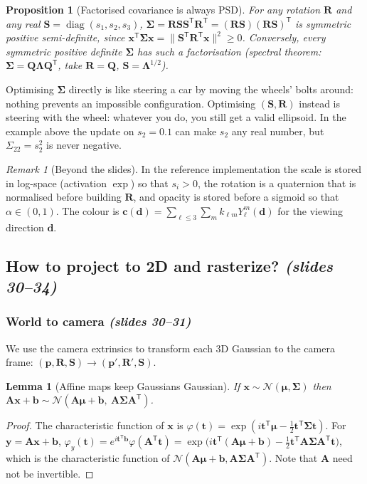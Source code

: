 \documentclass[11pt,a4paper]{article}
\newcommand{\sr}[1]{\texorpdfstring{\emph{(#1)}}{(#1)}}
\newcommand{\T}{^{\mathsf T}}
\newcommand{\N}{\mathcal{N}}
\DeclareMathOperator{\diag}{diag}
\theoremstyle{definition}
\theoremstyle{plain}
\newtheorem{lemma}[definition]{Lemma}
\newtheorem{proposition}[definition]{Proposition}
\theoremstyle{remark}
\newtheorem{remark}[definition]{Remark}
\begin{document}
\begin{proposition}[Factorised covariance is always PSD]
For any rotation $\bm R$ and any real $\bm S=\diag(s_1,s_2,s_3)$, $\bm\Sigma=\bm R\bm S\bm S\T\bm R\T=(\bm R\bm S)(\bm R\bm S)\T$ is symmetric positive semi-definite, since
$\bm x\T\bm\Sigma\bm x=\|\bm S\T\bm R\T\bm x\|^2\ge0$. Conversely, every symmetric positive definite $\bm\Sigma$ has such a factorisation (spectral theorem: $\bm\Sigma=\bm Q\bm\Lambda\bm Q\T$, take $\bm R=\bm Q$, $\bm S=\bm\Lambda^{1/2}$).
\end{proposition}

\begin{intuition}
Optimising $\bm\Sigma$ directly is like steering a car by moving the wheels' bolts around: nothing prevents an impossible configuration. Optimising $(\bm S,\bm R)$ instead is steering with the wheel: whatever you do, you still get a valid ellipsoid. In the example above the update on $s_2=0.1$ can make $s_2$ any real number, but $\Sigma_{22}=s_2^2$ is never negative.
\end{intuition}

\begin{remark}[Beyond the slides]
In the reference implementation the scale is stored in log-space (activation $\exp$) so that $s_i>0$, the rotation is a quaternion that is normalised before building $\bm R$, and opacity is stored before a sigmoid so that $\alpha\in(0,1)$. The colour is $\bm c(\bm d)=\sum_{\ell\le3}\sum_{m}k_{\ell m}Y_\ell^m(\bm d)$ for the viewing direction $\bm d$.
\end{remark}

\subsection{How to project to 2D and rasterize? \sr{slides 30--34}}
\subsubsection{World to camera \sr{slides 30--31}}
We use the camera extrinsics to transform each 3D Gaussian to the camera frame: $(\bm p,\bm R,\bm S)\to(\bm p',\bm R',\bm S)$.

\begin{lemma}[Affine maps keep Gaussians Gaussian]\label{lem:affine}
If $\bm x\sim\N(\bm\mu,\bm\Sigma)$ then $\bm A\bm x+\bm b\sim\N(\bm A\bm\mu+\bm b,\ \bm A\bm\Sigma\bm A\T)$.
\end{lemma}
\begin{proof}
The characteristic function of $\bm x$ is $\varphi(\bm t)=\exp(i\bm t\T\bm\mu-\tfrac12\bm t\T\bm\Sigma\bm t)$. For $\bm y=\bm A\bm x+\bm b$, $\varphi_y(\bm t)=e^{i\bm t\T\bm b}\varphi(\bm A\T\bm t)=\exp\big(i\bm t\T(\bm A\bm\mu+\bm b)-\tfrac12\bm t\T\bm A\bm\Sigma\bm A\T\bm t\big)$, which is the characteristic function of $\N(\bm A\bm\mu+\bm b,\bm A\bm\Sigma\bm A\T)$. Note that $\bm A$ need not be invertible.
\end{proof}
\end{document}
